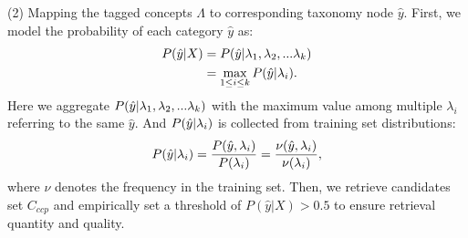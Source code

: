 (2) Mapping the tagged concepts $\Lambda$ to corresponding taxonomy node $\hat{y}$. First, we model the probability of each category $\hat{y}$ as:
\begin{equation}
    \begin{aligned}
    P(\hat{y} | X) &= P(\hat{y} \space | \space \lambda_1, \lambda_2, ... \lambda_k) \\ &= \max_{1 \leq i \leq k} P(\hat{y} \space | \space \lambda_i).
    \end{aligned}
\end{equation}
Here we aggregate $P(\hat{y} \space | \space \lambda_1, \lambda_2, ... \lambda_k)$ with the maximum value among multiple $\lambda_i$ referring to the same $\hat{y}$. And $P(\hat{y} \space | \space \lambda_i)$ is collected from training set distributions:
\begin{equation}
P(\hat{y} \space | \space \lambda_i) = \frac{P(\hat{y} \space , \space \lambda_i)}{P({\lambda_i})} = \frac{\nu(\hat{y} \space , \space \lambda_i)}{\nu({\lambda_i})},
\end{equation}
where $\nu$ denotes the frequency in the training set. Then, we retrieve candidates set ${C_{ccp}}$ and empirically set a threshold of $P(\hat{y} | X) > 0.5$ to ensure retrieval quantity and quality. 



